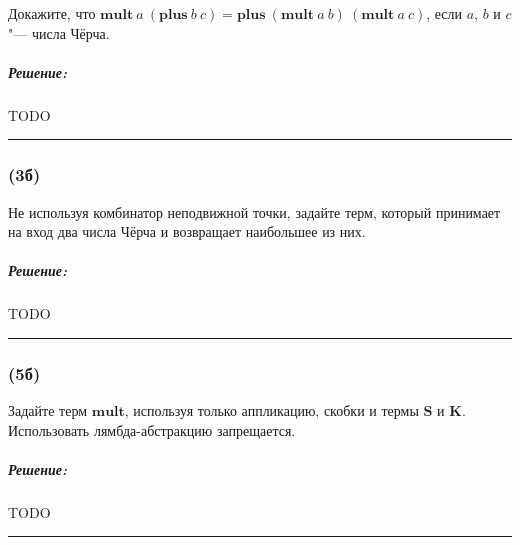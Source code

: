 \documentclass{article}
\newenvironment{proof}{\subparagraph{\hspace{-1em}Решение:\newline}}{\par\noindent\rule{\textwidth}{0.4pt}}
\begin{document}
    Докажите, что $\mathbf{mult}~a~(\mathbf{plus}~b~c) =
    \mathbf{plus}~(\mathbf{mult}~a~b)~(\mathbf{mult}~a~c)$, если $a$, $b$ и $c$ "---
    числа Чёрча.

    \begin{proof}
        TODO %
    \end{proof}

    \subsubsection{(3б)}

    Не используя комбинатор неподвижной точки, задайте терм, который
    принимает на вход два числа Чёрча и возвращает наибольшее из них.

    \begin{proof}
        TODO %
    \end{proof}

    \subsubsection{(5б)}

    Задайте терм $\mathbf{mult}$, используя только аппликацию, скобки и
    термы $\mathbf{S}$ и $\mathbf{K}$. Использовать лямбда-абстракцию
    запрещается.

    \begin{proof}
        TODO %
    \end{proof}
\end{document}
